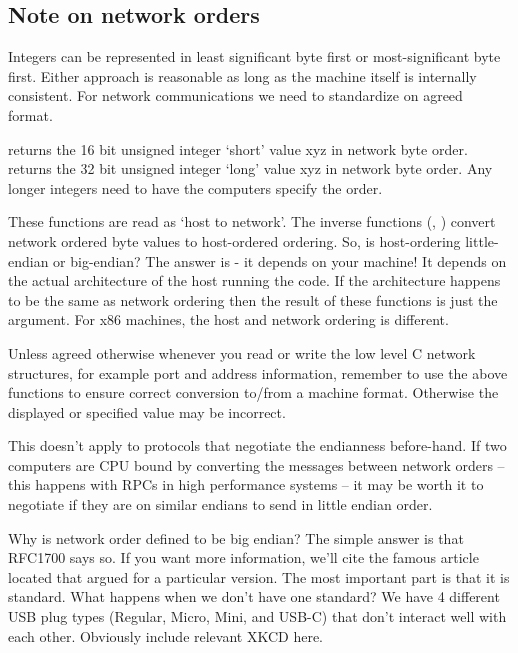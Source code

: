 \subsection{Note on network orders}

Integers can be represented in least significant byte first or most-significant byte first.
Either approach is reasonable as long as the machine itself is internally consistent.
For network communications we need to standardize on agreed format.

 returns the 16 bit unsigned integer `short' value xyz in network byte order.
 returns the 32 bit unsigned integer `long' value xyz in network byte order.
Any longer integers need to have the computers specify the order.

These functions are read as `host to network'.
The inverse functions (, ) convert network ordered byte values to host-ordered ordering.
So, is host-ordering little-endian or big-endian?
The answer is - it depends on your machine!
It depends on the actual architecture of the host running the code.
If the architecture happens to be the same as network ordering then the result of these functions is just the argument.
For x86 machines, the host and network ordering is different.

Unless agreed otherwise whenever you read or write the low level C network structures, for example port and address information, remember to use the above functions to ensure correct conversion to/from a machine format.
Otherwise the displayed or specified value may be incorrect.

This doesn't apply to protocols that negotiate the endianness before-hand.
If two computers are CPU bound by converting the messages between network orders -- this happens with RPCs in high performance systems -- it may be worth it to negotiate if they are on similar endians to send in little endian order.

Why is network order defined to be big endian?
The simple answer is that  RFC1700 says so.
If you want more information, we'll cite the famous article located  that argued for a particular version.
The most important part is that it is standard.
What happens when we don't have one standard?
We have 4 different USB plug types (Regular, Micro, Mini, and USB-C) that don't interact well with each other.
Obviously include relevant XKCD here.

